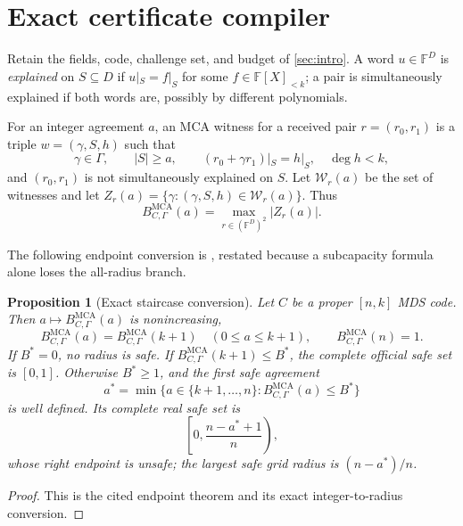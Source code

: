 \documentclass[a4paper,11pt]{amsart}
\newtheorem{proposition}[theorem]{Proposition}
\theoremstyle{remark}
\DeclareMathOperator{\MCA}{MCA}
\newcommand{\F}{\mathbb F}
\newcommand{\Gam}{\Gamma}
\newcommand{\abs}[1]{\lvert#1\rvert}
\begin{document}
\section{Exact certificate compiler}\label{sec:setup}

Retain the fields, code, challenge set, and budget of \cref{sec:intro}.  A
word \(u\in\F^D\) is \emph{explained} on \(S\subseteq D\) if
\(u|_S=f|_S\) for some \(f\in\F[X]_{<k}\); a pair is simultaneously
explained if both words are, possibly by different polynomials.

For an integer agreement \(a\), an MCA witness for a received pair
\(r=(r_0,r_1)\) is a triple \(w=(\gamma,S,h)\) such that
\[
 \gamma\in\Gam,\qquad \abs S\ge a,\qquad
 (r_0+\gamma r_1)|_S=h|_S,\quad \deg h<k,
\]
and \((r_0,r_1)\) is not simultaneously explained on \(S\).  Let
\(\mathcal W_r(a)\) be the set of witnesses and let
\(Z_r(a)=\{\gamma:(\gamma,S,h)\in\mathcal W_r(a)\}\).  Thus
\[
 B_{C,\Gam}^{\MCA}(a)=\max_{r\in(\F^D)^2}\abs{Z_r(a)}.
\]

The following endpoint conversion is
\cite[Theorem~1.4, Remark~4.4 and Lemma~B.1]{ChoShortening}, restated because
a subcapacity formula alone loses the all-radius branch.

\begin{proposition}[Exact staircase conversion]\label{prop:staircase}
Let \(C\) be a proper \([n,k]\) MDS code.  Then
\(a\mapsto B_{C,\Gam}^{\MCA}(a)\) is nonincreasing,
\[
 B_{C,\Gam}^{\MCA}(a)=B_{C,\Gam}^{\MCA}(k+1)
 \quad(0\le a\le k+1),
 \qquad B_{C,\Gam}^{\MCA}(n)=1.                    \tag{2.1}\label{eq:endpoints}
\]
If \(B^*=0\), no radius is safe.  If
\(B_{C,\Gam}^{\MCA}(k+1)\le B^*\), the complete official safe set is
\([0,1]\).  Otherwise \(B^*\ge1\), and the first safe agreement
\[
 a^*=\min\{a\in\{k+1,\ldots,n\}:B_{C,\Gam}^{\MCA}(a)\le B^*\}
\]
is well defined.  Its complete real safe set is
\[
 \left[0,\frac{n-a^*+1}{n}\right),                 \tag{2.2}\label{eq:safe-set-conversion}
\]
whose right endpoint is unsafe; the largest safe grid radius is
\((n-a^*)/n\).
\end{proposition}

\begin{proof}
This is the cited endpoint theorem and its exact integer-to-radius conversion.
\end{proof}
\end{document}

